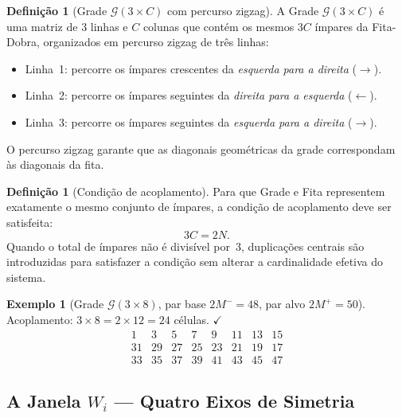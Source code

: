 \documentclass[12pt,a4paper]{article}
\theoremstyle{definition}
\newtheorem{definition}[theorem]{Definição}
\newtheorem{example}[theorem]{Exemplo}
\newcommand{\G}{\mathcal{G}}           %
\begin{document}
	\begin{definition}[Grade $\G(3 \times C)$ com percurso zigzag]
		\label{def:grade}
		A Grade $\G(3 \times C)$ é uma matriz de $3$ linhas e $C$ colunas
		que contém os mesmos $3C$ ímpares da Fita-Dobra, organizados em
		percurso zigzag de três linhas:
		\begin{itemize}
			\item Linha~1: percorre os ímpares crescentes da
			\emph{esquerda para a direita} ($\rightarrow$).
			\item Linha~2: percorre os ímpares seguintes da
			\emph{direita para a esquerda} ($\leftarrow$).
			\item Linha~3: percorre os ímpares seguintes da
			\emph{esquerda para a direita} ($\rightarrow$).
		\end{itemize}
		O percurso zigzag garante que as diagonais geométricas da grade
		correspondam às diagonais da fita.
	\end{definition}
	
	\begin{definition}[Condição de acoplamento]
		\label{def:acoplamento}
		Para que Grade e Fita representem exatamente o mesmo conjunto de
		ímpares, a condição de acoplamento deve ser satisfeita:
		\[
		3C = 2N.
		\]
		Quando o total de ímpares não é divisível por~$3$, duplicações
		centrais são introduzidas para satisfazer a condição sem alterar
		a cardinalidade efetiva do sistema.
	\end{definition}
	
	\begin{example}[Grade $\G(3 \times 8)$, par base $2M^- = 48$,
		par alvo $2M^+ = 50$]
		Acoplamento: $3 \times 8 = 2 \times 12 = 24$ células. $\checkmark$
		\[
		\begin{array}{cccccccc}
			1  & 3  & 5  & 7  & 9  & 11 & 13 & 15 \\
			31 & 29 & 27 & 25 & 23 & 21 & 19 & 17 \\
			33 & 35 & 37 & 39 & 41 & 43 & 45 & 47
		\end{array}
		\]
	\end{example}
	
	\subsection{A Janela \texorpdfstring{$W_i$}{Wi} — Quatro Eixos de Simetria}
	
\end{document}
